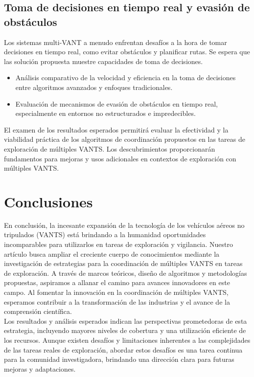\documentclass[sigconf]{acmart}
\begin{document}
\subsection*{Toma de decisiones en tiempo real y evasión de obstáculos}

Los sistemas multi-VANT a menudo enfrentan desafíos a la hora de tomar decisiones en tiempo real, como evitar obstáculos y planificar rutas. Se espera que las solución propuesta muestre capacidades de toma de decisiones.

\begin{itemize}
\item Análisis comparativo de la velocidad y eficiencia en la toma de decisiones entre algoritmos avanzados y enfoques tradicionales.
\item Evaluación de mecanismos de evasión de obstáculos en tiempo real, especialmente en entornos no estructurados e impredecibles.
\end{itemize}

El examen de los resultados esperados permitirá evaluar la efectividad y la viabilidad práctica de los algoritmos de coordinación propuestos en las tareas de exploración de múltiples VANTS. Los descubrimientos proporcionarán fundamentos para mejoras y usos adicionales en contextos de exploración con múltiples VANTS.

\section{Conclusiones}

En conclusión, la incesante expansión de la tecnología de los vehículos aéreos no tripulados (VANTS) está brindando a la humanidad oportunidades incomparables para utilizarlos en tareas de exploración y vigilancia. Nuestro artículo busca ampliar el creciente cuerpo de conocimientos mediante la investigación de estrategias para la coordinación de múltiples VANTS en tareas de exploración. A través de marcos teóricos, diseño de algoritmos y metodologías propuestas, aspiramos a allanar el camino para avances innovadores en este campo. Al fomentar la innovación en la coordinación de múltiples VANTS, esperamos contribuir a la transformación de las industrias y el avance de la comprensión científica.\\

Los resultados y análisis esperados indican las perspectivas prometedoras de esta estrategia, incluyendo mayores niveles de cobertura y una utilización eficiente de los recursos. Aunque existen desafíos y limitaciones inherentes a las complejidades de las tareas reales de exploración, abordar estos desafíos es una tarea continua para la comunidad investigadora, brindando una dirección clara para futuras mejoras y adaptaciones.\\
\end{document}
